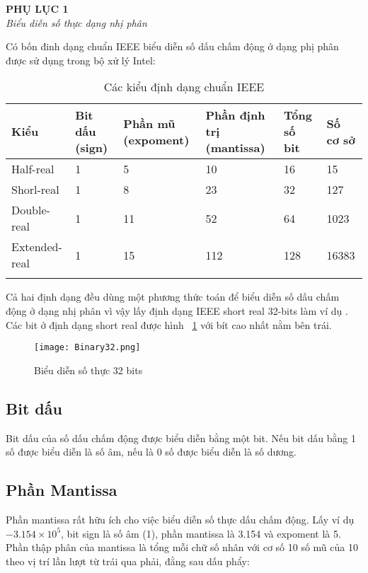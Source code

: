 \begin{center}
	\begin{huge}
			\textbf{PHỤ LỤC 1}\\
			\textit{Biểu diễn số thực dạng nhị phân}\\
	\end{huge}
\end{center}

Có bốn đinh dạng chuẩn IEEE biểu diễn số dấu chấm động ở dạng phị phân được sử dụng trong bộ xử lý Intel:
\begin{longtable}{|l|m{2cm}|m{3cm}|m{3cm}|l|l|}
	\hline
		Kiểu & Bit dấu (sign) & Phần mũ (expoment) &Phần định trị (mantissa) & Tổng số bit & Số cơ sở \\
	\hline
	\hline
			Half-real	&1&	5 &	10	&16	 &	15\\
	\hline
			Shorl-real &	1	& 8	 & 23	 & 32	&	127\\
	\hline
			Double-real &1 &	11 &52 &	64	&	1023\\
	\hline
		Extended-real&	1 &	15 &	112 &	128 &	16383\\
	\hline
	\caption{Các kiểu định dạng chuẩn IEEE}
\end{longtable}

Cả hai định dạng đều dùng một phương thức toán để biểu diễn số dấu chấm động ở dạng nhị phân vì vậy lấy định dạng IEEE short real 32-bits làm ví dụ . Các bit ở định dạng short real được hình ~\ref{fig:Bianry32} với bít cao nhất nằm bên trái.

		\begin{center}
			\begin{figure}[htp]
				\begin{center}
					\texttt{[image: Binary32.png]}
				\end{center}
				\caption{Biểu diễn số thực 32 bits}	
					\label{fig:Bianry32}		
			\end{figure}
		\end{center}			

\subsection*{Bit dấu}
 Bit dấu của số dấu chấm động được biểu diễn bằng một bit. Nếu bit dấu bằng 1 số được biểu diễn là số âm, nếu là 0 số được biểu diễn là số dương. \\
 
 \subsection*{Phần Mantissa}
 	Phần mantissa rất hữu ích cho việc biểu diễn số thực dấu chấm động. Lấy ví dụ $-3.154 \times 10^5$, bit sign là số âm (1), phần mantissa là 3.154 và expoment là 5. Phần thập phân của mantissa là tổng mỗi chữ số nhân với cơ số 10 số mũ của 10 theo vị trí lần lượt từ trái qua phải, đằng sau dấu phẩy:
 	
